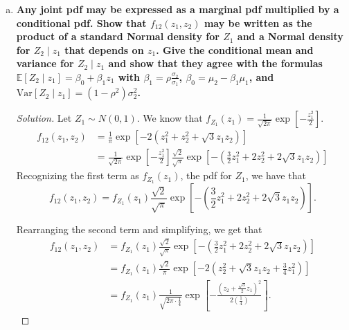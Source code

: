 \documentclass[11pt]{article}
\newenvironment{solution}
  {\renewcommand\qedsymbol{$\blacksquare$}\begin{proof}[Solution]}
  {\end{proof}}
\begin{document}
\begin{enumerate}
\begin{enumerate}[a)]
\begin{solution}
        Rewriting this expression, we have that 
        \begin{align*}
          f_{12}(z_1, z_2) &= \frac{1}{\pi} \exp \left[ - 2(z_1^2 + z_2^2 + \sqrt{3}z_1 z_2) \right] \\
          &= \frac{1}{2\pi \left( \frac{1}{2} \right)}  \exp \left[ -\frac{1}{2\left( \frac{1}{4} \right) }\left(z_1^2 + z_2^2 - 2\left( -\frac{\sqrt{3}}{2} \right) z_1 z_2 \right) \right].
        \end{align*}

        We recognize this as a bivariate Normal density, with 
        \[
          \boxed{\mu_1 = \mu_2 = 0, \sigma_1 = \sigma_2 = 1, \text{ and } \rho = -\frac{\sqrt{3}}{2}}. \qedhere
        \]
      \end{solution}

      \item \textbf{Any joint pdf may be expressed as a marginal pdf multiplied by a conditional pdf. Show that $f_{12}(z_1, z_2)$ may be written as the product of a standard Normal density for $Z_1$ and a Normal density for $Z_2\mid z_1$ that depends on $z_1$.
      Give the conditional mean and variance for $Z_2 \mid z_1$ and show that they agree with the formulas $\mathbb{E}[Z_2 \mid z_1] = \beta_0 + \beta_1 z_1$ with $\beta_1 = \rho \frac{\sigma_2}{\sigma_1}$, 
      $\beta_0 = \mu_2 - \beta_1 \mu_1$, and $\mathrm{Var} \left[Z_2 \mid z_1 \right] = (1-\rho^2)\sigma_2^2$.}

      \begin{solution}
      Let $Z_1 \sim N(0, 1)$. We know that $f_{Z_1}(z_1) = \frac{1}{\sqrt{2\pi}} \exp \left[ -\frac{z_1^2}{2} \right].$ 
      \begin{align*}
        f_{12}(z_1, z_2) &= \frac{1}{\pi} \exp \left[- 2(z_1^2 + z_2^2 + \sqrt{3}z_1 z_2) \right] \\
        &= \frac{1}{\sqrt{2\pi}} \exp \left[ -\frac{z_1^2}{2} \right] \frac{\sqrt{2}}{\sqrt{\pi}} \exp \left[- \left(\frac{3}{2}z_1^2 + 2z_2^2 + 2\sqrt{3}z_1 z_2\right) \right] 
      \end{align*}
      Recognizing the first term as $f_{Z_1}(z_1)$, the pdf for $Z_1$, we have that
      \[
        f_{12}(z_1, z_2) = f_{Z_1}(z_1) \frac{\sqrt{2}}{\sqrt{\pi}} \exp \left[- \left(\frac{3}{2}z_1^2 + 2z_2^2 + 2\sqrt{3}z_1 z_2\right) \right].
      \]

      Rearranging the second term and simplifying, we get that
      \begin{align*}
        f_{12}(z_1, z_2) &= f_{Z_1}(z_1) \frac{\sqrt{2}}{\sqrt{\pi}} \exp \left[- \left(\frac{3}{2}z_1^2 + 2z_2^2 + 2\sqrt{3}z_1 z_2\right) \right] \\
        &= f_{Z_1}(z_1) \frac{\sqrt{2}}{\pi} \exp \left[ -2\left(z_2^2 + \sqrt{3}z_1z_2 + \frac{3}{4}z_1^2  \right)\right] \\
        &= f_{Z_1}(z_1) \frac{1}{\sqrt{2\pi \cdot \frac{1}{4}}} \exp \left[ -\frac{\left( z_2 + \frac{\sqrt{3}}{2}z_1 \right)^2 }{2\left( \frac{1}{4} \right) }\right].
      \end{align*}


\end{solution}
\end{enumerate}
\end{enumerate}
\end{document}
